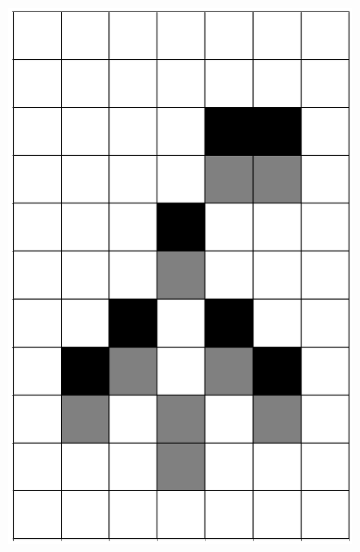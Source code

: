 \documentclass[12pt]{article}
\numberwithin{figure}{section} %
\begin{document}
\begin{figure}[H]
\begin{subfigure}{0.3\textwidth}
     		\includegraphics[angle=270,width=\linewidth]{Section4/6.1}
     		\subcaption{}
   	\end{subfigure}
        \begin{subfigure}{0.3\textwidth}
     		\centering

\end{subfigure}
\end{figure}
\end{document}
